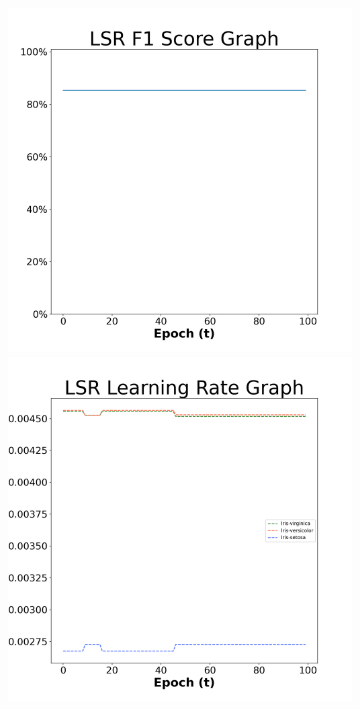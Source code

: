 \begin{figure}[H]
    \centering %
\begin{subfigure}{0.3\textwidth}
  \includegraphics[width=\linewidth]{images/exper2/iris/LSR_0.01_f1.png}
    \includegraphics[width=\linewidth]{images/exper2/iris/LSR_0.01_lr.png}

\end{subfigure}
\end{figure}

